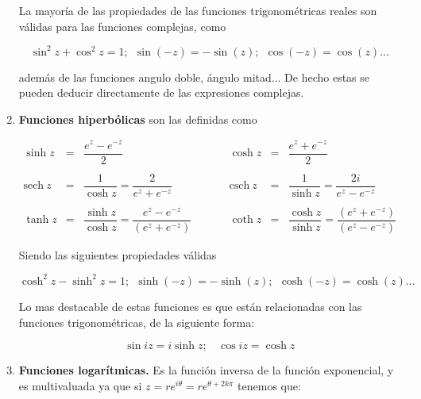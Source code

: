 \documentclass[12pt,a4paper]{book}
\newcommand{\sech}{\mathrm{sech} \ }
\newcommand{\csch}{\mathrm{csch} \ }
\begin{document}
\begin{enumerate}
La mayoría de las propiedades de las funciones trigonométricas reales son válidas para las funciones complejas, como

\begin{equation}
\sin^2 z + \cos^2 z = 1; \ \ \sin(-z) = - \sin(z); \ \ \cos (-z) = \cos (z) \ldots
\end{equation}

además de las funciones angulo doble, ángulo mitad... De hecho estas se pueden deducir directamente de las expresiones complejas.


\item  \textbf{Funciones hiperbólicas} son las definidas como


\begin{equation}
\begin{array}{cclccclc}

\sinh z & = & \dfrac{e^{z}-e^{-z}}{2} & \ \ \ \ \ \ \ \ & \cosh z & = & \dfrac{e^{z} + e^{-z}}{2} \\ \\

\sech z & = & \dfrac{1}{\cosh z} = \dfrac{2}{e^{z}+e^{-z}} & \ & \csch z& = & \dfrac{1}{\sinh z} = \dfrac{2i}{e^{z}-e^{-z}} \\ \\

\tanh z & = & \dfrac{\sinh z}{\cosh z} = \dfrac{e^{z}-e^{-z} }{ (e^{z}+e^{-z})} & & \coth z & = & \dfrac{\cosh z}{\sinh z} = \dfrac{(e^{z}+e^{-z})}{(e^{z}-e^{-z})} 

\end{array}
\end{equation}

Siendo las siguientes propiedades válidas

\begin{equation}
\cosh^2 z - \sinh^2 z = 1; \ \ \sinh (-z) = - \sinh (z); \ \ \cosh (-z) = \cosh (z) \ldots
\end{equation}


Lo mas destacable de estas funciones es que están relacionadas con las funciones trigonométricas, de la siguiente forma:

\begin{equation}
\sin iz = i \sinh z; \ \ \ \ \cos iz = \cosh z
\end{equation}

\item \textbf{Funciones logarítmicas.} Es la función inversa de la función exponencial, y es multivaluada ya que si $z = r e^{i \theta} = r e^{\theta + 2k \pi}$ tenemos que:


\end{enumerate}
\end{document}
